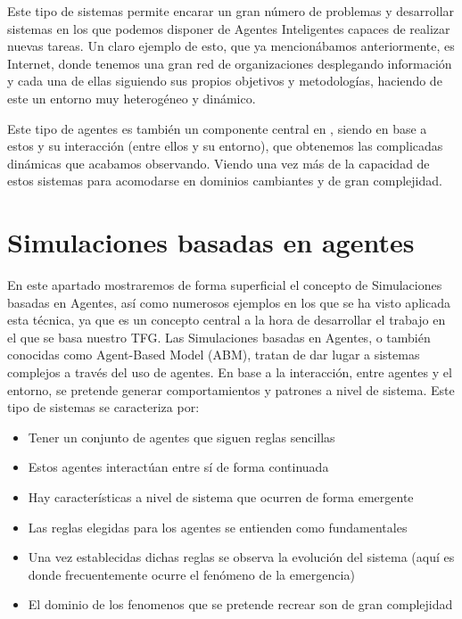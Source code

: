 Este tipo de sistemas permite encarar un gran número de problemas y desarrollar sistemas en los que podemos disponer de Agentes Inteligentes capaces de realizar nuevas tareas. Un claro ejemplo de esto, que ya mencionábamos anteriormente, es Internet, donde tenemos una gran red de organizaciones desplegando información y cada una de ellas siguiendo sus propios objetivos y metodologías, haciendo de este un entorno muy heterogéneo y dinámico.

Este tipo de agentes es también un componente central en \cite{park2023generative}, siendo en base a estos y su interacción (entre ellos y su entorno), que obtenemos las complicadas dinámicas que acabamos observando. Viendo una vez más de la capacidad de estos sistemas para acomodarse en dominios cambiantes y de gran complejidad.

\section{Simulaciones basadas en agentes}

En este apartado mostraremos de forma superficial el concepto de Simulaciones basadas en Agentes, así como numerosos ejemplos en los que se ha visto aplicada esta técnica, ya que es un concepto central a la hora de desarrollar el trabajo \cite{park2023generative} en el que se basa nuestro TFG.
Las Simulaciones basadas en Agentes, o también conocidas como Agent-Based Model (ABM), tratan de dar lugar a sistemas complejos a través del uso de agentes. En base a la interacción, entre agentes y el entorno, se pretende generar comportamientos y patrones a nivel de sistema.
Este tipo de sistemas se caracteriza por:
\begin{itemize}
	\item Tener un conjunto de agentes que siguen reglas sencillas
	\item Estos agentes interactúan entre sí de forma continuada
	\item Hay características a nivel de sistema que ocurren de forma emergente
	\item Las reglas elegidas para los agentes se entienden como fundamentales
	\item Una vez establecidas dichas reglas se observa la evolución del sistema (aquí es donde frecuentemente ocurre el fenómeno de la emergencia)
	\item El dominio de los fenomenos que se pretende recrear son de gran complejidad
\end{itemize}

